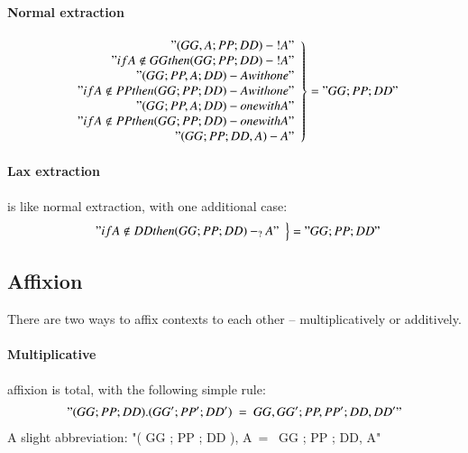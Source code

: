 \documentclass{article}
\begin{document}
\paragraph{Normal extraction}
\label{sec:normal-extraction}

\begin{align*}
  \left.
    \begin{array}{r}
      "( GG, A ; PP ; DD ) - {!A}" \\
      "{{if }} A \notin GG {{ then }} ( GG ; PP ; DD ) - {!A}" \\
      "( GG ; PP, A ; DD ) - A with one" \\
      "{{if }} A \notin PP {{ then }} ( GG ; PP ; DD ) - A with one" \\
      "( GG ; PP, A ; DD ) - one with A" \\
      "{{if }} A \notin PP {{ then }} ( GG ; PP ; DD ) - one with A" \\
      "( GG ; PP ; DD, A ) - A"
    \end{array}
  \right\} &= "GG ; PP ; DD" \\
\end{align*}

\paragraph{Lax extraction}
\label{sec:lax-extraction}

is like normal extraction, with one additional case:
\begin{align*}
  \left.
    \begin{array}{r}
      "{{if }} A \notin DD {{ then }} ( GG ; PP ; DD ) -_? A"
    \end{array}
  \right\} &= "GG ; PP ; DD" \\
\end{align*}


\subsection*{Affixion}
\label{sec:affixion}

There are two ways to affix contexts to each other -- multiplicatively
or additively.


\paragraph{Multiplicative}
\label{sec:multiplicative}

affixion is total, with the following simple rule:
\begin{gather*}
  "( GG ; PP ; DD ) . ( GG' ; PP' ; DD' )\ =\ GG, GG' ; PP, PP' ; DD, DD'"
\end{gather*}
A slight abbreviation: "( GG ; PP ; DD ), A\ = \ GG ; PP ; DD, A"
\end{document}
